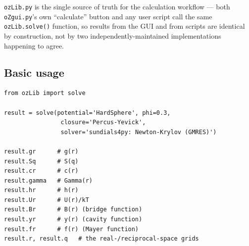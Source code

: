 \documentclass[11pt,a4paper]{article}
\newcommand{\code}[1]{\texttt{#1}}
\begin{document}
\code{ozLib.py} is the single source of truth for the calculation workflow ---
both \code{oZgui.py}'s own ``calculate'' button and any user script call the
same \code{ozLib.solve()} function, so results from the GUI and from scripts
are identical by construction, not by two independently-maintained
implementations happening to agree.

\subsection{Basic usage}
\begin{lstlisting}
from ozLib import solve

result = solve(potential='HardSphere', phi=0.3,
                closure='Percus-Yevick',
                solver='sundials4py: Newton-Krylov (GMRES)')

result.gr      # g(r)
result.Sq      # S(q)
result.cr      # c(r)
result.gamma   # Gamma(r)
result.hr      # h(r)
result.Ur      # U(r)/kT
result.Br      # B(r) (bridge function)
result.yr      # y(r) (cavity function)
result.fr      # f(r) (Mayer function)
result.r, result.q   # the real-/reciprocal-space grids
\end{lstlisting}
\end{document}
